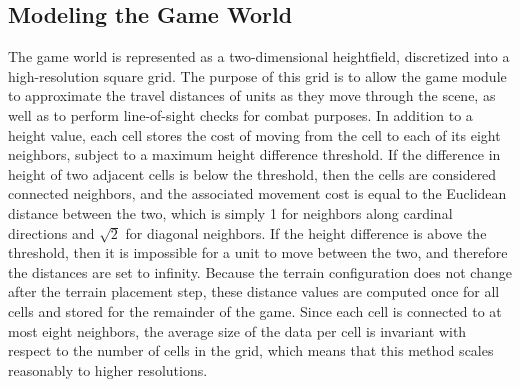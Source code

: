\documentclass{thesis}
\begin{document}




\subsection{Modeling the Game World }

The game world is represented as a two-dimensional heightfield, discretized into a high-resolution square grid. The purpose of this grid is to allow the game module to approximate the travel distances of units as they move through the scene, as well as to perform line-of-sight checks for combat purposes. In addition to a height value, each cell stores the cost of moving from the cell to each of its eight neighbors, subject to a maximum height difference threshold. If the difference in height of two adjacent cells is below the threshold, then the cells are considered connected neighbors, and the associated movement cost is equal to the Euclidean distance between the two, which is simply 1 for neighbors along cardinal directions and \begin{math}\sqrt2\end{math} for diagonal neighbors. If the height difference is above the threshold, then it is impossible for a unit to move between the two, and therefore the distances are set to infinity. 
Because the terrain configuration does not change after the terrain placement step, these distance values are computed once for all cells and stored for the remainder of the game. Since each cell is connected to at most eight neighbors, the average size of the data per cell is invariant with respect to the number of cells in the grid, which means that this method scales reasonably to higher resolutions.
\end{document}
